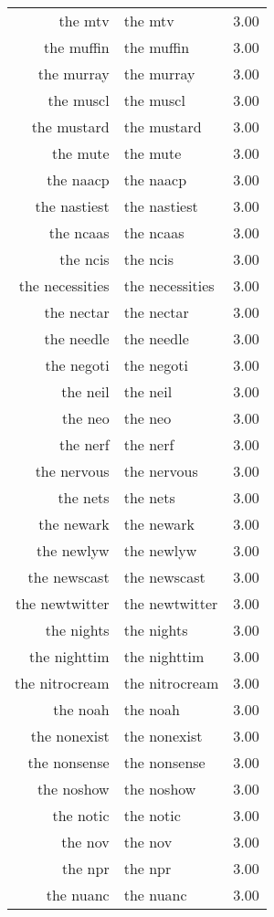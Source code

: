 \begin{table}[ht]
\begin{tabular}{rlr}
  the mtv & the mtv & 3.00 \\ 
  the muffin & the muffin & 3.00 \\ 
  the murray & the murray & 3.00 \\ 
  the muscl & the muscl & 3.00 \\ 
  the mustard & the mustard & 3.00 \\ 
  the mute & the mute & 3.00 \\ 
  the naacp & the naacp & 3.00 \\ 
  the nastiest & the nastiest & 3.00 \\ 
  the ncaas & the ncaas & 3.00 \\ 
  the ncis & the ncis & 3.00 \\ 
  the necessities & the necessities & 3.00 \\ 
  the nectar & the nectar & 3.00 \\ 
  the needle & the needle & 3.00 \\ 
  the negoti & the negoti & 3.00 \\ 
  the neil & the neil & 3.00 \\ 
  the neo & the neo & 3.00 \\ 
  the nerf & the nerf & 3.00 \\ 
  the nervous & the nervous & 3.00 \\ 
  the nets & the nets & 3.00 \\ 
  the newark & the newark & 3.00 \\ 
  the newlyw & the newlyw & 3.00 \\ 
  the newscast & the newscast & 3.00 \\ 
  the newtwitter & the newtwitter & 3.00 \\ 
  the nights & the nights & 3.00 \\ 
  the nighttim & the nighttim & 3.00 \\ 
  the nitrocream & the nitrocream & 3.00 \\ 
  the noah & the noah & 3.00 \\ 
  the nonexist & the nonexist & 3.00 \\ 
  the nonsense & the nonsense & 3.00 \\ 
  the noshow & the noshow & 3.00 \\ 
  the notic & the notic & 3.00 \\ 
  the nov & the nov & 3.00 \\ 
  the npr & the npr & 3.00 \\ 
  the nuanc & the nuanc & 3.00 \\ 

\end{tabular}
\end{table}
